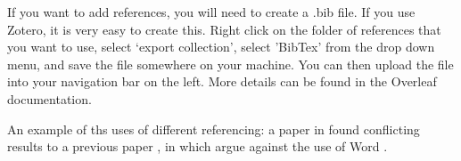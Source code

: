 

If you want to add references, you will need to create a .bib file. If you use Zotero, it is very easy to create this. Right click on the folder of references that you want to use, select `export collection', select 'BibTex' from the drop down menu, and save the file somewhere on your machine. You can then upload the file into your navigation bar on the left. More details can be found in the Overleaf documentation.


An example of ths uses of different referencing: a paper in \citeyear{scrivener_eeg_2019} found conflicting results to a previous paper \citep{scrivener_eeg_2019}, in which \citet{scrivener_eeg_2019} argue against the use of Word \citeyearpar{scrivener_eeg_2019}.